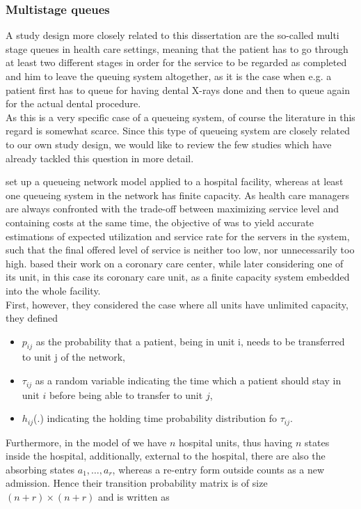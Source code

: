 \documentclass[11pt,a4paper]{article}
\begin{document}
\begin{spacing}{1.8}
\subsubsection{Multistage queues}
 A study design more closely related to this dissertation are the so-called multi stage queues in health care settings, meaning that the patient has to go through at least two different stages in order for the service to be regarded as completed and him to leave the queuing system altogether, as it is the case when e.g. a patient first has to queue for having dental X-rays done and then to queue again for the actual dental procedure. 
 \\
 As this is a very specific case of a queueing system, of course the literature in this regard is somewhat scarce. Since this type of queueing system are closely related to our own study design, we would like to review the few studies which have already tackled this question in more detail. 

\medskip
\citep{Hershey1981} set up a queueing network model applied to a hospital facility, whereas at least one queueing system in the network has finite capacity. As health care managers are always confronted with the trade-off between maximizing service level and containing costs at the same time, the objective of \citep{Hershey1981} was to yield accurate estimations of expected utilization and service rate for the servers in the system, such that the final offered level of service is neither too low, nor unnecessarily too high. \citet{Hershey1981} based their work on a coronary care center, while later considering one of its unit, in this case its coronary care unit, as a finite capacity system embedded into the whole facility. \\ First, however, they considered the case where all units have unlimited capacity, they defined 
\begin{itemize}
\item \(p_{ij}\) as the probability that a patient, being in unit i,  needs to be transferred to unit j of the network,
\item \(\tau_{ij}\) as a random variable indicating the time which a patient should stay in unit \(i\) before being able to transfer to unit \(j\),
\item \(h_{ij}\)(.) indicating the holding time probability distribution fo \(\tau_{ij}\). 
\end{itemize}
Furthermore, in the model of \citet{Hershey1981} we have \(n\) hospital units, thus having \(n\) states inside the hospital, additionally, external to the hospital, there are also the absorbing states \(a_1, \dots, a_r\), whereas a re-entry form outside counts as a new admission. Hence their transition probability matrix is of size \( (n + r) \times (n + r)\) and is written as


\end{spacing}
\end{document}
